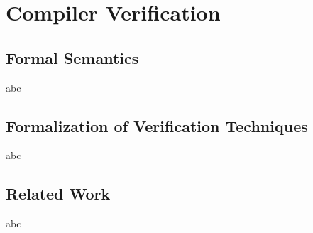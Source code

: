 \chapter{\;\;\;\;Compiler Verification}
\label{sec:compiler}






\section{Formal Semantics}
\label{sec:compiler:semantics}
abc

\section{Formalization of Verification Techniques}
\label{sec:compiler:verification}
abc

\section{Related Work}
\label{sec:compiler:related}
abc
